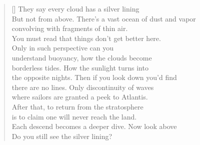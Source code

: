 \documentclass{book}
\begin{document}
\settowidth{\versewidth}{But not from above. There's a vast ocean of dust and vapor}
\begin{verse}[\versewidth]
    They say every cloud has a silver lining\\
    But not from above. There's a vast ocean of dust and vapor\\
    convolving with fragments of thin air.\\
    You must read that things don't get better here.\\
    Only in such perspective can you\\
    understand buoyancy, how the clouds become\\
    borderless tides. How the sunlight turns into\\
    the opposite nights. Then if you look down you'd find\\
    there are no lines. Only discontinuity of waves\\
    where sailors are granted a peek to Atlantis.\\
    After that, to return from the stratosphere\\
    is to claim one will never reach the land. \\
    Each descend becomes a deeper dive. Now look above\\
    Do you still see the silver lining?\\
\end{verse}
\end{document}
